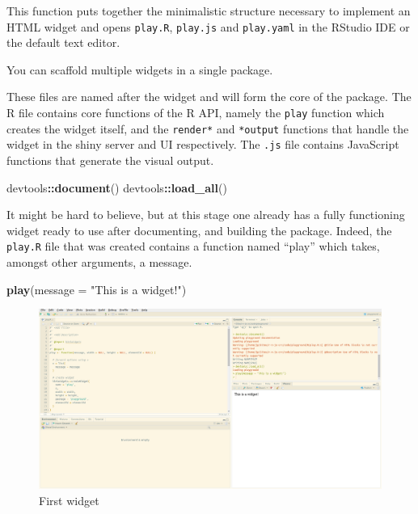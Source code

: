 \documentclass[
]{krantz}
\makeatletter
\newenvironment{Shaded}{\begin{snugshade}}{\end{snugshade}}
\newcommand{\DataTypeTok}[1]{\textcolor[rgb]{0.27,0.27,0.27}{#1}}
\newcommand{\KeywordTok}[1]{\textcolor[rgb]{0.27,0.27,0.27}{\textbf{#1}}}
\newcommand{\NormalTok}[1]{#1}
\newcommand{\OperatorTok}[1]{\textcolor[rgb]{0.43,0.43,0.43}{\textbf{#1}}}
\newcommand{\StringTok}[1]{\textcolor[rgb]{0.5,0.5,0.5}{#1}}
\newenvironment{kframe}{%
\medskip{}
\setlength{\fboxsep}{.8em}
 \def\at@end@of@kframe{}%
 \ifinner\ifhmode%
  \def\at@end@of@kframe{\end{minipage}}%
  \begin{minipage}{\columnwidth}%
 \fi\fi%
 \def\FrameCommand##1{\hskip\@totalleftmargin \hskip-\fboxsep
 \colorbox{shadecolor}{##1}\hskip-\fboxsep
     \hskip-\linewidth \hskip-\@totalleftmargin \hskip\columnwidth}%
 \MakeFramed {\advance\hsize-\width
   \@totalleftmargin\z@ \linewidth\hsize
   \@setminipage}}%
 {\par\unskip\endMakeFramed%
 \at@end@of@kframe}
\renewenvironment{Shaded}{\begin{kframe}}{\end{kframe}}
\newenvironment{rmdblock}[1]
  {
  \begin{itemize}
  \renewcommand{\labelitemi}{
    \raisebox{-.7\height}[0pt][0pt]{
      {\setkeys{Gin}{width=3em,keepaspectratio}\texttt{[image: images/\#1]}}
    }
  }
  \setlength{\fboxsep}{1em}
  \begin{kframe}
  \item
  }
  {
  \end{kframe}
  \end{itemize}
  }
\newenvironment{rmdnote}
  {\begin{rmdblock}{note}}
  {\end{rmdblock}}
\makeatother
\begin{document}
This function puts together the minimalistic structure necessary to implement an HTML widget and opens \texttt{play.R}, \texttt{play.js} and \texttt{play.yaml} in the RStudio IDE or the default text editor.

\begin{rmdnote}
You can scaffold multiple widgets in a single package.
\end{rmdnote}

These files are named after the widget and will form the core of the package. The R file contains core functions of the R API, namely the \texttt{play} function which creates the widget itself, and the \texttt{render*} and \texttt{*output} functions that handle the widget in the shiny server and UI respectively. The \texttt{.js} file contains JavaScript functions that generate the visual output.

\begin{Shaded}
\begin{Highlighting}[]
\NormalTok{devtools}\OperatorTok{::}\KeywordTok{document}\NormalTok{()}
\NormalTok{devtools}\OperatorTok{::}\KeywordTok{load\_all}\NormalTok{()}
\end{Highlighting}
\end{Shaded}

It might be hard to believe, but at this stage one already has a fully functioning widget ready to use after documenting, and building the package. Indeed, the \texttt{play.R} file that was created contains a function named ``play'' which takes, amongst other arguments, a message.

\begin{Shaded}
\begin{Highlighting}[]
\KeywordTok{play}\NormalTok{(}\DataTypeTok{message =} \StringTok{"This is a widget!"}\NormalTok{)}
\end{Highlighting}
\end{Shaded}

\begin{figure}[t]

{\centering \includegraphics[width=1\linewidth]{images/playground-1} 

}

\caption{First widget}\label{fig:playground-1}
\end{figure}
\end{document}
